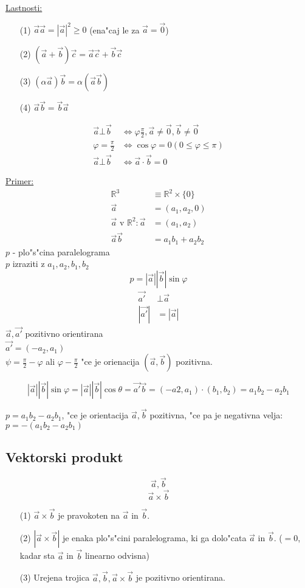 \underline{Lastnosti:}
\begin{enumerate}
	\item[(1)] \(\vec{a} \vec{a} = |\vec{a}|^2 \geq 0\) (ena"caj le za \(\vec{a} = \vec{0}\))
	\item[(2)] \((\vec{a} + \vec{b})\vec{c} = \vec{a}\vec{c} + \vec{b}\vec{c}\)
	\item[(3)] \((\alpha\vec{a})\vec{b} = \alpha(\vec{a}\vec{b})\)
	\item[(4)] \(\vec{a}\vec{b} = \vec{b}\vec{a}\)
\end{enumerate}

\begin{align*}
	\vec{a} \bot \vec{b} &\Leftrightarrow \varphi \frac{\pi}{2}, \vec{a} \neq \vec{0}, \vec{b} \neq \vec{0}\\
	\varphi = \frac{\pi}{2} &\Leftrightarrow \cos\varphi = 0 (0 \leq \varphi \leq \pi)\\
	\vec{a} \bot \vec{b} &\Leftrightarrow \vec{a} \cdot \vec{b} = 0
\end{align*}

\underline{Primer:}
\begin{align*}
	\mathbb{R}^3 &\equiv \mathbb{R}^2 \times \{0\}\\
	\vec{a} &= (a_1, a_2, 0)\\
	\vec{a} \text{ v } \mathbb{R}^2: \vec{a} &= (a_1, a_2)\\
	\vec{a} \vec{b} &= a_1b_1 + a_2b_2
\end{align*}
\(p\) - plo"s"cina paralelograma\\
\(p\) izraziti z \(a_1, a_2, b_1, b_2\)
\[p = |\vec{a}||\vec{b}|\sin\varphi\]
\begin{align*}
	\vec{a'} &\bot \vec{a}\\
	|\vec{a'}| &= |\vec{a}|
\end{align*}
\(\vec{a}, \vec{a'}\) pozitivno orientirana\\
\(\vec{a'} = (-a_2, a_1)\)\\
\(\psi = \frac{\pi}{2} - \varphi\) ali \(\varphi - \frac{\pi}{2}\) "ce je orienacija \((\vec{a}, \vec{b})\) pozitivna.

\[|\vec{a}||\vec{b}| \sin\varphi = |\vec{a}||\vec{b}|\cos\theta = \vec{a'}\vec{b} = (-a2, a_1) \cdot (b_1, b_2) = a_1b_2 - a_2b_1\]

\(p = a_1b_2 - a_2b_1\), "ce je orientacija \(\vec{a}, \vec{b}\) pozitivna, "ce pa je negativna velja: \(p = -(a_1b_2 - a_2b_1)\)

\subsection{Vektorski produkt}
$$\vec{a}, \vec{b}$$
$$\vec{a} \times \vec{b}$$
\begin{enumerate}
	\item[(1)] $\vec{a} \times \vec{b}$ je pravokoten na $\vec{a}$ in $\vec{b}$.
	\item[(2)] $|\vec{a} \times \vec{b}|$ je enaka plo"s"cini paralelograma, ki ga dolo"cata $\vec{a}$ in $\vec{b}$. ($=0$, kadar sta $\vec{a}$ in $\vec{b}$ linearno odvisna)
	\item[(3)] Urejena trojica $\vec{a}, \vec{b}, \vec{a} \times \vec{b}$ je pozitivno orientirana.
\end{enumerate}

